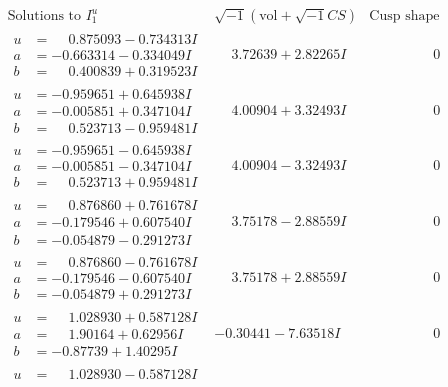 \documentclass[1p]{elsarticle_modified}
\theoremstyle{definition}
\newcommand{\I}{\sqrt{-1}}
\begin{document}
$$\begin{array}{c|c|c}
\text{Solutions to }I^u_{1}& \I (\text{vol} + \sqrt{-1}CS) & \text{Cusp shape}\\
 \hline 
\begin{aligned}
u &= \phantom{-}0.875093 - 0.734313 I \\
a &= -0.663314 - 0.334049 I \\
b &= \phantom{-}0.400839 + 0.319523 I\end{aligned}
 & \phantom{-}3.72639 + 2.82265 I & \phantom{-0.000000 } 0 \\ \hline\begin{aligned}
u &= -0.959651 + 0.645938 I \\
a &= -0.005851 + 0.347104 I \\
b &= \phantom{-}0.523713 - 0.959481 I\end{aligned}
 & \phantom{-}4.00904 + 3.32493 I & \phantom{-0.000000 } 0 \\ \hline\begin{aligned}
u &= -0.959651 - 0.645938 I \\
a &= -0.005851 - 0.347104 I \\
b &= \phantom{-}0.523713 + 0.959481 I\end{aligned}
 & \phantom{-}4.00904 - 3.32493 I & \phantom{-0.000000 } 0 \\ \hline\begin{aligned}
u &= \phantom{-}0.876860 + 0.761678 I \\
a &= -0.179546 + 0.607540 I \\
b &= -0.054879 - 0.291273 I\end{aligned}
 & \phantom{-}3.75178 - 2.88559 I & \phantom{-0.000000 } 0 \\ \hline\begin{aligned}
u &= \phantom{-}0.876860 - 0.761678 I \\
a &= -0.179546 - 0.607540 I \\
b &= -0.054879 + 0.291273 I\end{aligned}
 & \phantom{-}3.75178 + 2.88559 I & \phantom{-0.000000 } 0 \\ \hline\begin{aligned}
u &= \phantom{-}1.028930 + 0.587128 I \\
a &= \phantom{-}1.90164 + 0.62956 I \\
b &= -0.87739 + 1.40295 I\end{aligned}
 & -0.30441 - 7.63518 I & \phantom{-0.000000 } 0 \\ \hline\begin{aligned}
u &= \phantom{-}1.028930 - 0.587128 I \\

\end{aligned}
\end{array}$$
\end{document}
